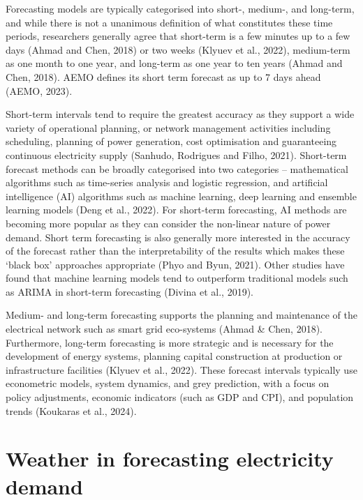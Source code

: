 \documentclass[mstat,12pt]{unswthesis}
\begin{document}
\bigskip

Forecasting models are typically categorised into short-, medium-, and long-term, and while there is not a unanimous definition of what constitutes these time periods, researchers generally agree that short-term is a few minutes up to a few days (Ahmad and Chen, 2018) or two weeks (Klyuev et al., 2022), medium-term as one month to one year, and long-term as one year to ten years (Ahmad and Chen, 2018). AEMO defines its short term forecast as up to 7 days ahead (AEMO, 2023).

\bigskip

Short-term intervals tend to require the greatest accuracy as they support a wide variety of operational planning, or network management activities including scheduling, planning of power generation, cost optimisation and guaranteeing continuous electricity supply (Sanhudo, Rodrigues and Filho, 2021). Short-term forecast methods can be broadly categorised into two categories -- mathematical algorithms such as time-series analysis and logistic regression, and artificial intelligence (AI) algorithms such as machine learning, deep learning and ensemble learning models (Deng et al., 2022). For short-term forecasting, AI methods are becoming more popular as they can consider the non-linear nature of power demand. Short term forecasting is also generally more interested in the accuracy of the forecast rather than the interpretability of the results which makes these `black box' approaches appropriate (Phyo and Byun, 2021). Other studies have found that machine learning models tend to outperform traditional models such as ARIMA in short-term forecasting (Divina et al., 2019).

\bigskip

Medium- and long-term forecasting supports the planning and maintenance of the electrical network such as smart grid eco-systems (Ahmad \& Chen, 2018). Furthermore, long-term forecasting is more strategic and is necessary for the development of energy systems, planning capital construction at production or infrastructure facilities (Klyuev et al., 2022). These forecast intervals typically use econometric models, system dynamics, and grey prediction, with a focus on policy adjustments, economic indicators (such as GDP and CPI), and population trends (Koukaras et al., 2024).

\section{Weather in forecasting electricity demand}\label{weather-in-forecasting-electricity-demand}
\end{document}
